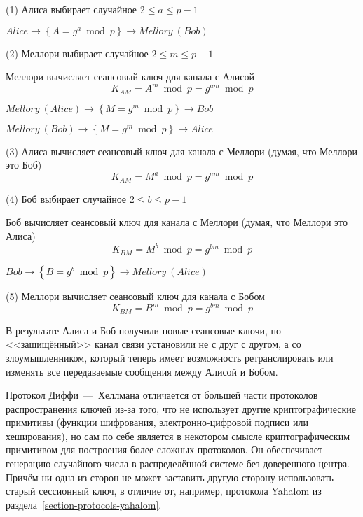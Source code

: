 \begin{protocol}
    \item[(1)] Алиса выбирает случайное $2 \leq a \leq p - 1$
    \item[{}] $Alice \to \left\{ A = g ^ a \bmod p \right\} \to Mellory~(Bob)$
    \item[(2)] Меллори выбирает случайное $2 \leq m \leq p-1$
    \item[{}] Меллори вычисляет сеансовый ключ для канала с Алисой
        \[K_{AM} = A ^ m \bmod p = g ^ {am} \bmod p\]
    \item[{}] $Mellory~(Alice) \to \left\{ M = g ^ m \bmod p \right\} \to Bob$
    \item[{}] $Mellory~(Bob) \to \left\{ M = g ^ m \bmod p \right\} \to Alice$
    \item[(3)] Алиса вычисляет сеансовый ключ для канала с Меллори (думая, что Меллори это Боб)
        \[K_{AM} = M ^ a \bmod p = g ^ { am } \bmod p\]
    \item[(4)] Боб выбирает случайное $2 \leq b \leq p-1$
    \item[{}] Боб вычисляет сеансовый ключ для канала с Меллори (думая, что Меллори это Алиса)
        \[K_{BM} = M ^ b \bmod p = g ^ { bm } \bmod p\]
    \item[{}] $Bob \to \left\{ B = g ^ b \bmod p \right\} \to Mellory~(Alice)$
    \item[(5)] Меллори вычисляет сеансовый ключ для канала с Бобом
        \[K_{BM} = B ^ m \bmod p = g ^ { bm } \bmod p\]
\end{protocol}

В результате Алиса и Боб получили новые сеансовые ключи, но <<защищённый>> канал связи установили не с друг с другом, а со злоумышленником, который теперь имеет возможность ретранслировать или изменять все передаваемые сообщения между Алисой и Бобом.

Протокол Диффи~---~Хеллмана отличается от большей части протоколов распространения ключей из-за того, что не использует другие криптографические примитивы (функции шифрования, электронно-цифровой подписи или хеширования), но сам по себе является в некотором смысле криптографическим примитивом для построения более сложных протоколов. Он обеспечивает генерацию случайного числа в распределённой системе без доверенного центра. Причём ни одна из сторон не может заставить другую сторону использовать старый сессионный ключ, в отличие от, например, протокола Yahalom из раздела~\ref{section-protocols-yahalom}.

